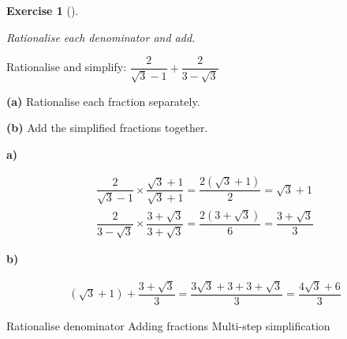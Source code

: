 \documentclass[
  letterpaper,
  DIV=11,
  numbers=noendperiod]{scrreprt}
\theoremstyle{definition}
\newtheorem{exercise}{Exercise}[chapter]
\theoremstyle{remark}
\begin{document}
\begin{exercise}[]\protect\hypertarget{exr-u2-55}{}\label{exr-u2-55}

\emph{Rationalise each denominator and add.}

Rationalise and simplify:
\(\dfrac{2}{\sqrt{3}-1}+\dfrac{2}{3-\sqrt{3}}\)

\textbf{(a)} Rationalise each fraction separately.

\textbf{(b)} Add the simplified fractions together.

\begin{tcolorbox}[enhanced jigsaw, opacitybacktitle=0.6, coltitle=black, arc=.35mm, colframe=quarto-callout-tip-color-frame, colback=white, bottomrule=.15mm, left=2mm, colbacktitle=quarto-callout-tip-color!10!white, titlerule=0mm, opacityback=0, title=\textcolor{quarto-callout-tip-color}{\faLightbulb}\hspace{0.5em}{🔍 View Solution}, leftrule=.75mm, breakable, rightrule=.15mm, bottomtitle=1mm, toptitle=1mm, toprule=.15mm]

\textbf{a)}

\[
\begin{aligned}
\dfrac{2}{\sqrt{3}-1}\times\dfrac{\sqrt{3}+1}{\sqrt{3}+1}=\dfrac{2(\sqrt{3}+1)}{2}=\sqrt{3}+1 \\ \dfrac{2}{3-\sqrt{3}}\times\dfrac{3+\sqrt{3}}{3+\sqrt{3}}=\dfrac{2(3+\sqrt{3})}{6}=\dfrac{3+\sqrt{3}}{3}
\end{aligned}
\]

\textbf{b)}

\[
\begin{aligned}
(\sqrt{3}+1)+\dfrac{3+\sqrt{3}}{3}=\dfrac{3\sqrt{3}+3+3+\sqrt{3}}{3}=\dfrac{4\sqrt{3}+6}{3}
\end{aligned}
\]

\end{tcolorbox}

{Rationalise denominator} {Adding fractions} {Multi-step simplification}

\end{exercise}
\end{document}
